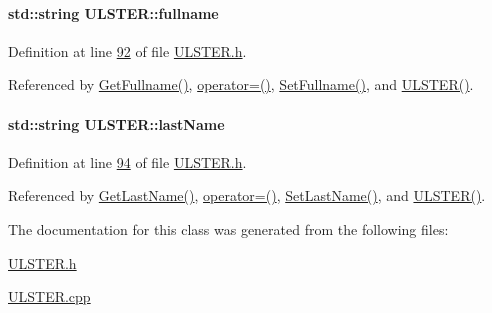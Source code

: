 \paragraph[{\texorpdfstring{fullname}{fullname}}]{\setlength{\rightskip}{0pt plus 5cm}std\+::string U\+L\+S\+T\+E\+R\+::fullname\hspace{0.3cm}{\ttfamily [private]}}\hypertarget{class_u_l_s_t_e_r_a5dc42cbd515825463ba31c8d3dcfe1b6_a5dc42cbd515825463ba31c8d3dcfe1b6}{}\label{class_u_l_s_t_e_r_a5dc42cbd515825463ba31c8d3dcfe1b6_a5dc42cbd515825463ba31c8d3dcfe1b6}


Definition at line \hyperlink{_u_l_s_t_e_r_8h_source_l00092}{92} of file \hyperlink{_u_l_s_t_e_r_8h_source}{U\+L\+S\+T\+E\+R.\+h}.



Referenced by \hyperlink{_u_l_s_t_e_r_8cpp_source_l00107}{Get\+Fullname()}, \hyperlink{_u_l_s_t_e_r_8h_source_l00062}{operator=()}, \hyperlink{_u_l_s_t_e_r_8cpp_source_l00103}{Set\+Fullname()}, and \hyperlink{_u_l_s_t_e_r_8h_source_l00024}{U\+L\+S\+T\+E\+R()}.

\paragraph[{\texorpdfstring{last\+Name}{lastName}}]{\setlength{\rightskip}{0pt plus 5cm}std\+::string U\+L\+S\+T\+E\+R\+::last\+Name\hspace{0.3cm}{\ttfamily [private]}}\hypertarget{class_u_l_s_t_e_r_afa319e559a6a7653aa67e6d8f801d7ee_afa319e559a6a7653aa67e6d8f801d7ee}{}\label{class_u_l_s_t_e_r_afa319e559a6a7653aa67e6d8f801d7ee_afa319e559a6a7653aa67e6d8f801d7ee}


Definition at line \hyperlink{_u_l_s_t_e_r_8h_source_l00094}{94} of file \hyperlink{_u_l_s_t_e_r_8h_source}{U\+L\+S\+T\+E\+R.\+h}.



Referenced by \hyperlink{_u_l_s_t_e_r_8cpp_source_l00091}{Get\+Last\+Name()}, \hyperlink{_u_l_s_t_e_r_8h_source_l00062}{operator=()}, \hyperlink{_u_l_s_t_e_r_8cpp_source_l00087}{Set\+Last\+Name()}, and \hyperlink{_u_l_s_t_e_r_8h_source_l00024}{U\+L\+S\+T\+E\+R()}.



The documentation for this class was generated from the following files\+:\begin{DoxyCompactItemize}
\item 
\hyperlink{_u_l_s_t_e_r_8h}{U\+L\+S\+T\+E\+R.\+h}\item 
\hyperlink{_u_l_s_t_e_r_8cpp}{U\+L\+S\+T\+E\+R.\+cpp}\end{DoxyCompactItemize}
